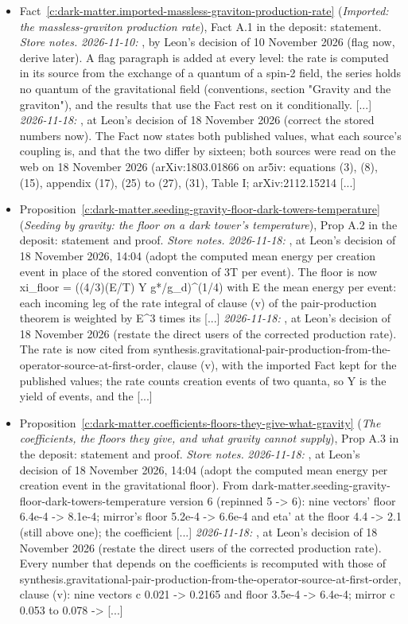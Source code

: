 \documentclass[11pt]{article}
\theoremstyle{definition}
\theoremstyle{plain}
\begin{document}
\begin{itemize}
\item Fact~\ref{c:dark-matter.imported-massless-graviton-production-rate} (\emph{Imported: the massless-graviton production rate}), Fact A.1 in the deposit: statement. \emph{Store notes.} \emph{2026-11-10:} , by Leon's decision of 10 November 2026 (flag now, derive later). A flag paragraph is added at every level: the rate is computed in its source from the exchange of a quantum of a spin-2 field, the series holds no quantum of the gravitational field (conventions, section "Gravity and the graviton"), and the results that use the Fact rest on it conditionally. [...] \emph{2026-11-18:} , at Leon's decision of 18 November 2026 (correct the stored numbers now). The Fact now states both published values, what each source's coupling is, and that the two differ by sixteen; both sources were read on the web on 18 November 2026 (arXiv:1803.01866 on ar5iv: equations (3), (8), (15), appendix (17), (25) to (27), (31), Table I; arXiv:2112.15214 [...]
\item Proposition~\ref{c:dark-matter.seeding-gravity-floor-dark-towers-temperature} (\emph{Seeding by gravity: the floor on a dark tower's temperature}), Prop A.2 in the deposit: statement and proof. \emph{Store notes.} \emph{2026-11-18:} , at Leon's decision of 18 November 2026, 14:04 (adopt the computed mean energy per creation event in place of the stored convention of 3T per event). The floor is now xi\_floor = ((4/3)(E/T) Y g*/g\_d)\^{}(1/4) with E the mean energy per event: each incoming leg of the rate integral of clause (v) of the pair-production theorem is weighted by E\^{}3 times its [...] \emph{2026-11-18:} , at Leon's decision of 18 November 2026 (restate the direct users of the corrected production rate). The rate is now cited from synthesis.gravitational-pair-production-from-the-operator-source-at-first-order, clause (v), with the imported Fact kept for the published values; the rate counts creation events of two quanta, so Y is the yield of events, and the [...]
\item Proposition~\ref{c:dark-matter.coefficients-floors-they-give-what-gravity} (\emph{The coefficients, the floors they give, and what gravity cannot supply}), Prop A.3 in the deposit: statement and proof. \emph{Store notes.} \emph{2026-11-18:} , at Leon's decision of 18 November 2026, 14:04 (adopt the computed mean energy per creation event in the gravitational floor). From dark-matter.seeding-gravity-floor-dark-towers-temperature version 6 (repinned 5 -> 6): nine vectors' floor 6.4e-4 -> 8.1e-4; mirror's floor 5.2e-4 -> 6.6e-4 and eta' at the floor 4.4 -> 2.1 (still above one); the coefficient [...] \emph{2026-11-18:} , at Leon's decision of 18 November 2026 (restate the direct users of the corrected production rate). Every number that depends on the coefficients is recomputed with those of synthesis.gravitational-pair-production-from-the-operator-source-at-first-order, clause (v): nine vectors c 0.021 -> 0.2165 and floor 3.5e-4 -> 6.4e-4; mirror c 0.053 to 0.078 -> [...]

\end{itemize}
\end{document}

